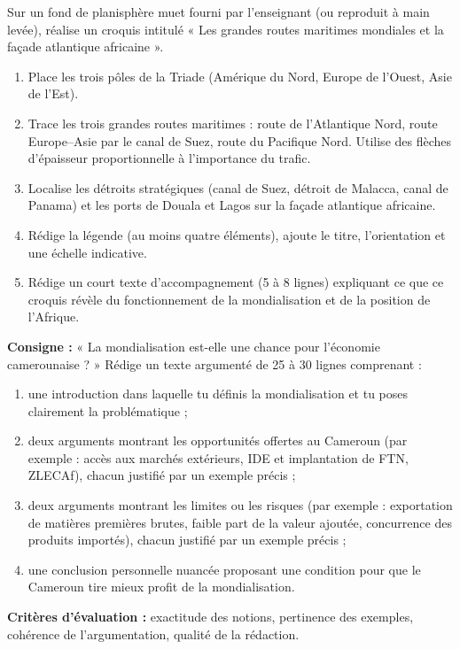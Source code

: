 \documentclass[11pt]{article}
\begin{document}
\begin{exercice}
Sur un fond de planisphère muet fourni par l'enseignant (ou reproduit à main levée), réalise un croquis intitulé « Les grandes routes maritimes mondiales et la façade atlantique africaine ».
\begin{enumerate}
\item Place les trois pôles de la Triade (Amérique du Nord, Europe de l'Ouest, Asie de l'Est).
\item Trace les trois grandes routes maritimes : route de l'Atlantique Nord, route Europe--Asie par le canal de Suez, route du Pacifique Nord. Utilise des flèches d'épaisseur proportionnelle à l'importance du trafic.
\item Localise les détroits stratégiques (canal de Suez, détroit de Malacca, canal de Panama) et les ports de Douala et Lagos sur la façade atlantique africaine.
\item Rédige la légende (au moins quatre éléments), ajoute le titre, l'orientation et une échelle indicative.
\item Rédige un court texte d'accompagnement (5 à 8 lignes) expliquant ce que ce croquis révèle du fonctionnement de la mondialisation et de la position de l'Afrique.
\end{enumerate}
\end{exercice}

\begin{exercice}
\textbf{Consigne :} « La mondialisation est-elle une chance pour l'économie camerounaise ? » Rédige un texte argumenté de 25 à 30 lignes comprenant :
\begin{enumerate}
\item une introduction dans laquelle tu définis la mondialisation et tu poses clairement la problématique ;
\item deux arguments montrant les opportunités offertes au Cameroun (par exemple : accès aux marchés extérieurs, IDE et implantation de FTN, ZLECAf), chacun justifié par un exemple précis ;
\item deux arguments montrant les limites ou les risques (par exemple : exportation de matières premières brutes, faible part de la valeur ajoutée, concurrence des produits importés), chacun justifié par un exemple précis ;
\item une conclusion personnelle nuancée proposant une condition pour que le Cameroun tire mieux profit de la mondialisation.
\end{enumerate}
\textbf{Critères d'évaluation :} exactitude des notions, pertinence des exemples, cohérence de l'argumentation, qualité de la rédaction.
\end{exercice}
\end{document}
